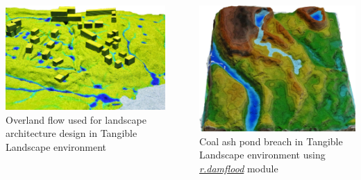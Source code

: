 \documentclass[25pt, margin=0mm, innermargin=15mm, blockverticalspace=15mm, colspace=15mm, subcolspace=8mm]{tikzposter}
\newcommand{\gamodule}[1]{\href{http://grass.osgeo.org/grass70/manuals/addons/#1.html}{\emph{#1}}}
\begin{document}
\begin{columns}
{\begin{minipage}{0.5\linewidth}
\includegraphics[width=\textwidth]{rsimwater_architects}
Overland flow used for landscape architecture design in Tangible Landscape environment
\end{minipage}
~
\begin{minipage}{0.5\linewidth}
\includegraphics[width=\textwidth]{damflood_tangible}
Coal ash pond breach in Tangible Landscape environment using \gamodule{r.damflood} module
\end{minipage}

\vspace*{1.4cm}
}




\end{columns}
\end{document}
